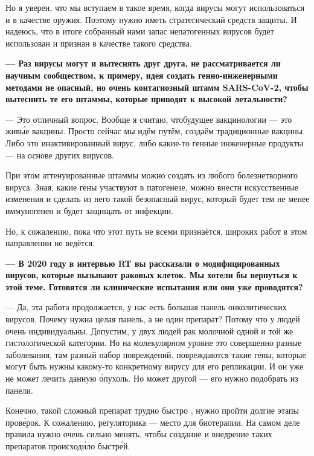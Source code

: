 Но я уверен, что мы вступаем в такое время, когда вирусы могут использоваться и в качестве оружия. Поэтому нужно иметь стратегический   средств защиты. И надеюсь, что в итоге собранный нами запас непатогенных вирусов будет использован и признан в качестве такого средства.

{\bf --- Раз вирусы могут  и вытеснять друг друга, не рассматривается ли научным сообществом, к примеру, идея создать генно-инженерными методами не опасный, но очень контагиозный штамм SARS-CoV-2, чтобы вытеснить те его штаммы, которые приводят к высокой летальности? }

--- Это отличный вопрос. Вообще я считаю, чтобудущее вакцинологии --- это жив\'{ы}е вакцины. Просто сейчас мы идём  путём, создаём традиционные вакцины. Либо это инактивированный вирус, либо какие-то генные инженерные продукты --- на основе других вирусов.

При этом аттенуированные штаммы можно создать из л\'{ю}бого болезнетворного вируса. Зная, какие гены участвуют в патогенезе, можно внести искусственные изменения и сделать из него такой безопасный вирус, который будет тем не менее иммуногенен и будет защищать от инфекции.

Но, к сожалению, пока что этот путь не всеми признаётся, широких работ в этом направлении не ведётся.

{\bf --- В 2020 году в интервью RT вы рассказали о  модифицированных вирусов, которые вызывают  раковых клеток. Мы хотели бы вернуться к этой теме. Готовятся ли клинические испытания или они уже проводятся?}

--- Да, эта работа продолжается, у нас есть большая панель онколитических вирусов. Почему нужна целая панель, а не один препарат? Потому что  у людей очень индивидуальны. Допустим, у двух людей рак молочной  одной и той же гистологической категории. Но на молекулярном уровне это совершенно разные заболевания, там разный набор повреждений.  повреждаются такие гены, которые могут быть нужны какому-то конкретному вирусу для его репликации. И он уже не может лечить данную \'{о}пухоль. Но может другой --- его нужно подобрать из панели.

Конечно, такой сложный препарат трудно быстро , нужно пройти долгие этапы пров\'{е}рок. К сожалению, регуляторика ---  место для биотерапии. На самом деле правила нужно очень сильно менять, чтобы создание и внедрение таких препаратов происход\'{и}ло быстр\'{е}й.

